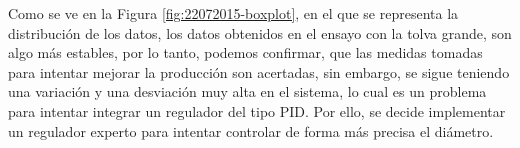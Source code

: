 Como se ve en la Figura \ref{fig:22072015-boxplot}, en el que se representa la distribución de los datos, los datos obtenidos en el ensayo con la tolva grande, son algo más estables, por lo tanto, podemos confirmar, que las medidas tomadas para intentar mejorar la producción son acertadas, sin embargo, se sigue teniendo una variación y una desviación muy alta en el sistema, lo cual es un problema para intentar integrar un regulador del tipo PID. Por ello, se decide implementar un regulador experto para intentar controlar de forma más precisa el diámetro.


